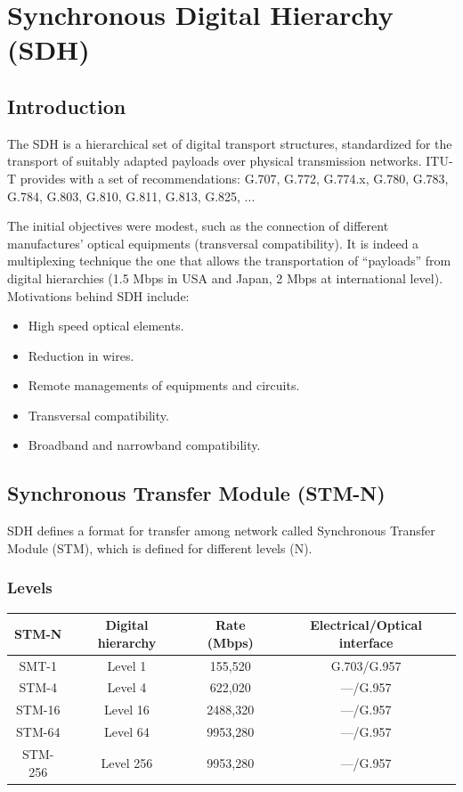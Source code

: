 \documentclass[../main.tex]{subfiles}
\begin{document}
\section{Synchronous Digital Hierarchy (SDH)}

\subsection{Introduction}

The SDH is a hierarchical set of digital transport structures, standardized for the transport of suitably adapted payloads over physical transmission networks. ITU-T provides with a set of recommendations: G.707, G.772, G.774.x, G.780, G.783, G.784, G.803, G.810, G.811, G.813, G.825, ...

The initial objectives were modest, such as the connection of different manufactures’ optical equipments (transversal compatibility). It is indeed a multiplexing technique the one that allows the transportation of ``payloads'' from digital hierarchies (1.5 Mbps in USA and Japan, 2 Mbps at international level). Motivations behind SDH include:

\begin{itemize}
	\item High speed optical elements.
	\item Reduction in wires.
	\item Remote managements of equipments and circuits.
	\item Transversal compatibility.
	\item Broadband and narrowband compatibility.
\end{itemize}

\subsection{Synchronous Transfer Module (STM-N)}

SDH defines a format for transfer among network called Synchronous Transfer Module (STM), which is defined for different levels (N).

\subsubsection{Levels}

\begin{tabular}{|c|c|c|c|}
	\hline
	STM-N	& Digital hierarchy	& Rate (Mbps)	& Electrical/Optical interface \\
	\hline
	SMT-1	& Level 1			& 155,520		& G.703/G.957 \\
	\hline
	STM-4	& Level 4			& 622,020		& ---/G.957 \\
	\hline
	STM-16	& Level 16			& 2488,320		& ---/G.957 \\
	\hline
	STM-64	& Level 64			& 9953,280		& ---/G.957 \\
	\hline
	STM-256	& Level 256			& 9953,280		& ---/G.957 \\
	\hline
\end{tabular}
\end{document}
